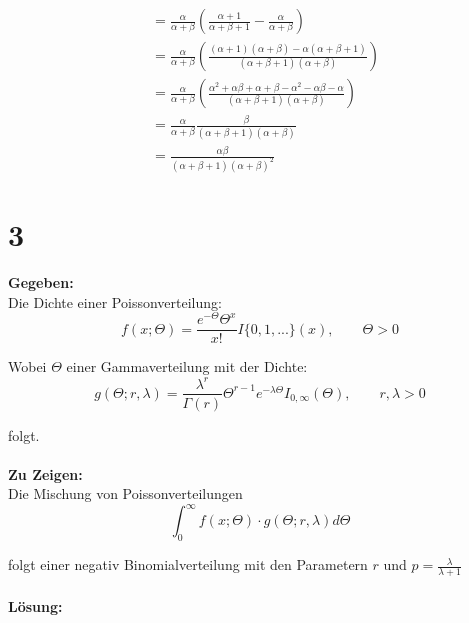 \documentclass{article}
\begin{document}
\begin{align*}
    &= \frac{\alpha}{\alpha + \beta}\left(\frac{\alpha + 1}{\alpha + \beta + 1} - \frac{\alpha}{\alpha + \beta}\right) \\
    &= \frac{\alpha}{\alpha + \beta} \left(\frac{(\alpha + 1)(\alpha + \beta)- \alpha (\alpha + \beta + 1)}{(\alpha + \beta + 1)(\alpha + \beta)}\right) \\
    &= \frac{\alpha}{\alpha + \beta} \left(\frac{\alpha^2 + \alpha \beta + \alpha + \beta - \alpha^2 - \alpha \beta - \alpha}{(\alpha + \beta + 1)(\alpha + \beta)}\right) \\
    &= \frac{\alpha}{\alpha + \beta}\frac{\beta}{(\alpha + \beta + 1)(\alpha + \beta)} \\
    &= \frac{\alpha \beta}{(\alpha + \beta + 1)(\alpha + \beta)^2}
\end{align*}

\section*{3}
\textbf{Gegeben:} \\

Die Dichte einer Poissonverteilung:
\[f(x;\Theta)= \frac{e^{-\Theta}\Theta^{x}}{x!} I{\{0,1,...\}}(x), \qquad \Theta > 0\] 

Wobei $\Theta$ einer Gammaverteilung mit der Dichte:
\[g(\Theta; r, \lambda) = \frac{\lambda^r}{\Gamma(r)}\Theta^{r-1} e^{-\lambda\Theta}I_{0, \infty}(\Theta), \qquad r, \lambda > 0\]

folgt.\\\\
\textbf{Zu Zeigen:}\\

Die Mischung von Poissonverteilungen 
\[\int_0^{\infty} f(x; \Theta) \cdot g(\Theta; r, \lambda)d\Theta\]

folgt einer negativ Binomialverteilung mit den Parametern $r$ und $p = \frac{\lambda}{\lambda + 1}$ \\ \\
\textbf{Lösung:}
\end{document}
